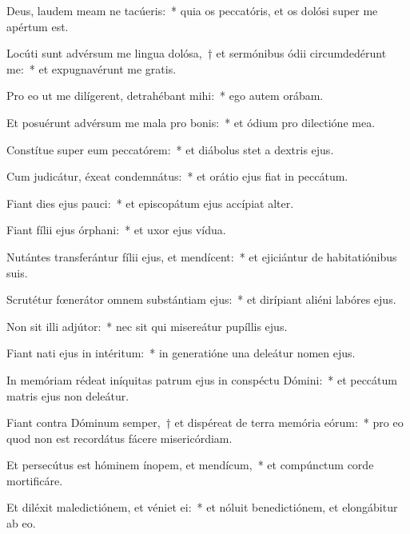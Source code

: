 \item Deus, laudem meam ne tacúeris:~* quia os peccatóris, et os dolósi super me apértum est.

\item Locúti sunt advérsum me lingua dolósa,~† et sermónibus ódii circumdedérunt me:~* et expugnavérunt me gratis.

\item Pro eo ut me dilígerent, detrahébant mihi:~* ego autem orábam.

\item Et posuérunt advérsum me mala pro bonis:~* et ódium pro dilectióne mea.

\item Constítue super eum peccatórem:~* et diábolus stet a dextris ejus.

\item Cum judicátur, éxeat condemnátus:~* et orátio ejus fiat in peccátum.

\item Fiant dies ejus pauci:~* et episcopátum ejus accípiat alter.

\item Fiant fílii ejus órphani:~* et uxor ejus vídua.

\item Nutántes transferántur fílii ejus, et mendícent:~* et ejiciántur de habitatiónibus suis.

\item Scrutétur fœnerátor omnem substántiam ejus:~* et dirípiant aliéni labóres ejus.

\item Non sit illi adjútor:~* nec sit qui misereátur pupíllis ejus.

\item Fiant nati ejus in intéritum:~* in generatióne una deleátur nomen ejus.

\item In memóriam rédeat iníquitas patrum ejus in conspéctu Dómini:~* et peccátum matris ejus non deleátur.

\item Fiant contra Dóminum semper,~† et dispéreat de terra memória eórum:~* pro eo quod non est recordátus fácere misericórdiam.

\item Et persecútus est hóminem ínopem, et mendícum,~* et compúnctum corde mortificáre.

\item Et diléxit maledictiónem, et véniet ei:~* et nóluit benedictiónem, et elongábitur ab eo.

